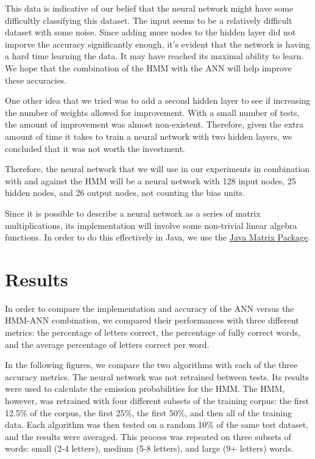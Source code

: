 \documentclass[11pt,a4paper,twocolumn]{article}
\begin{document}
This data is indicative of our belief that the neural network might have some difficultly classifying this dataset. The input seems to be a relatively difficult dataset with some noise. Since adding more nodes to the hidden layer did not imporve the accuracy significantly enough, it's evident that the network is having a hard time learning the data. It may have reached its maximal ability to learn. We hope that the combination of the HMM with the ANN will help improve these accuracies.

One other idea that we tried was to add a second hidden layer to see if increasing the number of weights allowed for improvement. With a small number of tests, the amount of improvement was almost non-existent. Therefore, given the extra amount of time it takes to train a neural network with two hidden layers, we concluded that it was not worth the investment.

Therefore, the neural network that we will use in our experiments in combination with and against the HMM will be a neural network with 128 input nodes, 25 hidden nodes, and 26 output nodes, not counting the bias units.

Since it is possible to describe a neural network as a series of matrix multiplications, its implementation will involve some non-trivial linear algebra functions. In order to do this effectively in Java, we use the \href{http://math.nist.gov/javanumerics/jama/}{Java Matrix Package}.


\section{Results}

In order to compare the implementation and accuracy of the ANN versus the HMM-ANN combination, we compared their performances with three different metrics: the percentage of letters correct, the percentage of fully correct words, and the average percentage of letters correct per word. 

In the following figures, we compare the two algorithms with each of the three accuracy metrics. The neural network was not retrained between tests. Its results were used to calculate the emission probabilities for the HMM. The HMM, however, was retrained with four different subsets of the training corpus: the first 12.5\% of the corpus, the first 25\%, the first 50\%, and then all of the training data. Each algorithm was then tested on a random 10\% of the same test dataset, and the results were averaged. This process was repeated on three subsets of words: small (2-4 letters), medium (5-8 letters), and large (9+ letters) words.
\end{document}
